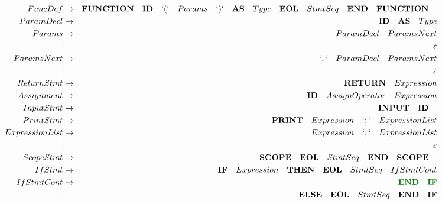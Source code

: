\documentclass[a4paper,11pt,landscape,leqno]{article}
\begin{document}
\begin{eqnarray}
    FuncDef    &    \rightarrow    & \textbf{FUNCTION}\quad \textbf{ID}\quad `(`\quad Params\quad `)`\quad \textbf{AS}\quad Type\quad \textbf{EOL}\quad StmtSeq\quad \textbf{END}\quad \textbf{FUNCTION}\quad \\
ParamDecl   &   \rightarrow   & {\textbf{ID}\quad \textbf{AS}\quad Type}    \\
Params      &    \rightarrow    & {ParamDecl}\quad ParamsNext  \\
            &    |              & \varepsilon             \\
ParamsNext  &    \rightarrow    & `,`\quad {ParamDecl}\quad  ParamsNext   \\
            &    |              & \varepsilon             \\
ReturnStmt  &   \rightarrow     & \textbf{RETURN}\quad Expression     \\
Assignment  & \rightarrow       & \textbf{ID}\quad AssignOperator \quad Expression \\
InputStmt   &    \rightarrow    & \textbf{INPUT}\quad \textbf{ID}\quad   \\
PrintStmt   &    \rightarrow    & \textbf{PRINT}\quad Expression\quad `;` \quad ExpressionList\\
ExpressionList&  \rightarrow    &  Expression\quad `;`\quad ExpressionList\\
            &    |              & \varepsilon   \\
ScopeStmt   &    \rightarrow    &    \textbf{SCOPE}\quad   \textbf{EOL} \quad StmtSeq\quad   \textbf{END}\quad \textbf{SCOPE}\quad    \\
IfStmt  &    \rightarrow        & \textbf{IF} \quad Expression \quad \textbf{THEN}\quad \textbf{EOL}\quad StmtSeq \quad IfStmtCont   \\
IfStmtCont  &   \rightarrow     & \textcolor{green1}{\textbf{END}\quad \textbf{IF}}  \\
&   |      &    \textbf{ELSE}\quad  \textbf{EOL}\quad StmtSeq\quad \textbf{END}\quad \textbf{IF}   \\

\end{eqnarray}
\end{document}
